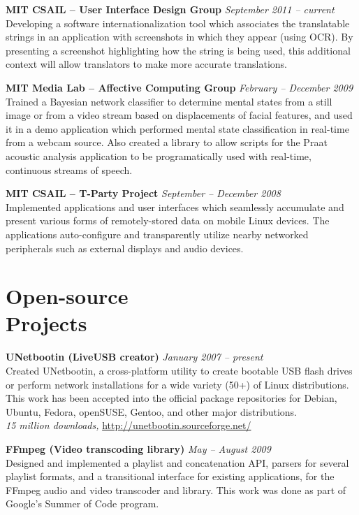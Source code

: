 \documentclass[margin,line]{resume}
\begin{document}
\begin{resume}
\textbf{MIT CSAIL -- User Interface Design Group} \hfill \textsl{September 2011 -- current}\\
Developing a software internationalization tool which associates the translatable strings in an application with screenshots in which they appear (using OCR). By presenting a screenshot highlighting how the string is being used, this additional context will allow translators to make more accurate translations.

\textbf{MIT Media Lab -- Affective Computing Group} \hfill \textsl{February -- December 2009}\\
Trained a Bayesian network classifier to determine mental states from a still image or from a video stream based on displacements of facial features, and used it in a demo application which performed mental state classification in real-time from a webcam source.
Also created a library to allow scripts for the Praat acoustic analysis application to be programatically used with real-time, continuous streams of speech.

\textbf{MIT CSAIL -- T-Party Project} \hfill \textsl{September -- December 2008}\\
Implemented applications and user interfaces which seamlessly accumulate and present various forms of remotely-stored data on mobile Linux devices. The applications auto-configure and transparently utilize nearby networked peripherals such as external displays and audio devices.

\section{\mysidestyle Open-source\\Projects}

\textbf{UNetbootin (LiveUSB creator)} \hfill \textsl{January 2007 -- present}\\
Created UNetbootin, a cross-platform utility to create bootable USB flash drives or perform network installations for a wide variety (50+) of Linux distributions. This work has been accepted into the official package repositories for Debian, Ubuntu, Fedora, openSUSE, Gentoo, and other major distributions. \\
\emph{15 million downloads,} \url{http://unetbootin.sourceforge.net/}

\textbf{FFmpeg (Video transcoding library)} \hfill \textsl{May -- August 2009}\\
Designed and implemented a playlist and concatenation API, parsers for several playlist formats, and a transitional interface for existing applications, for the FFmpeg audio and video transcoder and library. This work was done as part of Google's Summer of Code program.


\end{resume}
\end{document}
